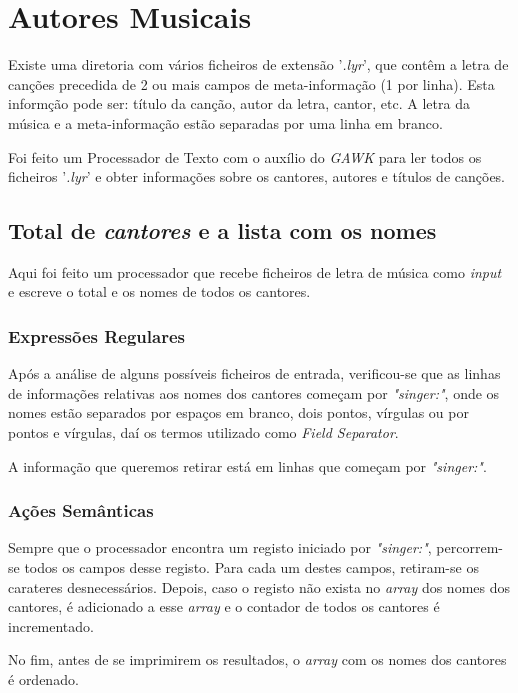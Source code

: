 \documentclass{article}
\begin{document}
\section{Autores Musicais}

Existe uma diretoria com vários ficheiros de extensão '\emph{.lyr}', que contêm a letra de canções precedida de 2 ou mais campos de meta-informação (1 por linha). Esta informção pode ser: título da canção, autor da letra, cantor, etc. A letra da música e a meta-informação estão separadas por uma linha em branco.

Foi feito um Processador de Texto com o auxílio do \emph{GAWK} para ler todos os ficheiros '\emph{.lyr}' e obter informações sobre os cantores, autores e títulos de canções.

\subsection{Total de \emph{cantores} e a lista com os nomes}

Aqui foi feito um processador que recebe ficheiros de letra de música como \emph{input} e escreve o total e os nomes de todos os cantores.

\subsubsection{Expressões Regulares}

Após a análise de alguns possíveis ficheiros de entrada, verificou-se que as linhas de informações relativas aos nomes dos cantores começam por \emph{"singer:"}, onde os nomes estão separados por espaços em branco, dois pontos, vírgulas ou por pontos e vírgulas, daí os termos utilizado como \emph{Field Separator}.

A informação que queremos retirar está em linhas que começam por \emph{"singer:"}.

\subsubsection{Ações Semânticas}

Sempre que o processador encontra um registo iniciado por \emph{"singer:"}, percorrem-se todos os campos desse registo. Para cada um destes campos, retiram-se os carateres desnecessários. Depois, caso o registo não exista no \emph{array} dos nomes dos cantores, é adicionado a esse \emph{array} e o contador de todos os cantores é incrementado.

No fim, antes de se imprimirem os resultados, o \emph{array} com os nomes dos cantores é ordenado.
\end{document}
